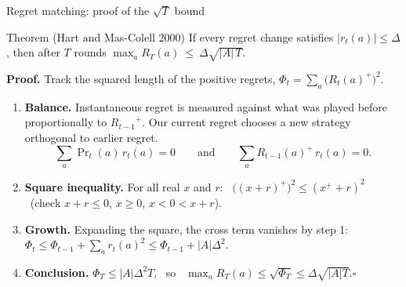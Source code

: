 \documentclass[10pt,aspectratio=169]{beamer}
\newcommand{\pos}[1]{{{#1}^{+}}}
\begin{document}
\begin{frame}{Regret matching: proof of the $\sqrt T$ bound}
\begin{block}{Theorem (Hart and Mas-Colell 2000)}
If every regret change satisfies $|r_t(a)|\le\Delta$, then after $T$ rounds \quad $\max_a R_T(a)\ \le\ \Delta\sqrt{|A|\,T}$.
\end{block}
\pause
\textbf{Proof.} Track the squared length of the positive regrets, \quad $\Phi_t=\sum_a \big(\pos{R_t(a)}\big)^2$.
\small
\begin{enumerate}[<+->]\setlength\itemsep{3pt}
\item \textbf{Balance.} Instantaneous regret is measured against what was played before proportionally to $\pos{R_{t-1}}$. Our current regret
chooses a new strategy orthogonal to earlier regret.
\[ \textstyle\sum_a \Pr\nolimits_t(a)\, r_t(a)=0 \qquad\text{and}\qquad \sum_a \pos{R_{t-1}(a)}\, r_t(a)=0 . \]
\item \textbf{Square inequality.} For all real $x$ and $r$: \ $\big(\pos{(x+r)}\big)^2 \le (\pos x+r)^2$ \ (check $x+r\le0$, $x\ge0$, $x<0<x+r$).
\item \textbf{Growth.} Expanding the square, the cross term vanishes by step 1:
\ $\Phi_t \le \Phi_{t-1} + \sum_a r_t(a)^2 \le \Phi_{t-1} + |A|\Delta^2$.
\item \textbf{Conclusion.} $\Phi_T\le|A|\Delta^2T$, \ so \ $\max_a R_T(a) \le \sqrt{\Phi_T} \le \Delta\sqrt{|A|T}$.\hfill$\square$
\end{enumerate}
\end{frame}

\end{document}
